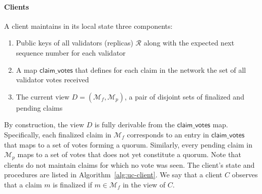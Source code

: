 \documentclass{article}
\begin{document}
\paragraph{Clients\\}
A client maintains in its local state three components:
\begin{enumerate}
    \item Public keys of all validators (replicas) $\mathcal{R}$ along with the expected next sequence number for each validator
    \item A map $\textsf{claim\_votes}$ that defines for each claim in the network the set of all validator votes received 
    \item The current view $D = (\mathcal{M}_f, \mathcal{M}_p)$, a pair of disjoint sets of finalized and pending claims
\end{enumerate}
By construction, the view $D$ is fully derivable from the $\textsf{claim\_votes}$ map. Specifically, each finalized claim in $\mathcal{M}_f$ corresponds to an entry in $\textsf{claim\_votes}$ that maps to a set of votes forming a quorum. Similarly, every pending claim in $\mathcal{M}_p$ maps to a set of votes that does not yet constitute a quorum. Note that clients do not maintain claims for which no vote was seen. The client's state and procedures are listed in Algorithm~\ref{alg:uc-client}. We say that a client $C$ observes that a claim $m$ is finalized if $m \in \mathcal{M}_f$ in the view of $C$.
\end{document}
